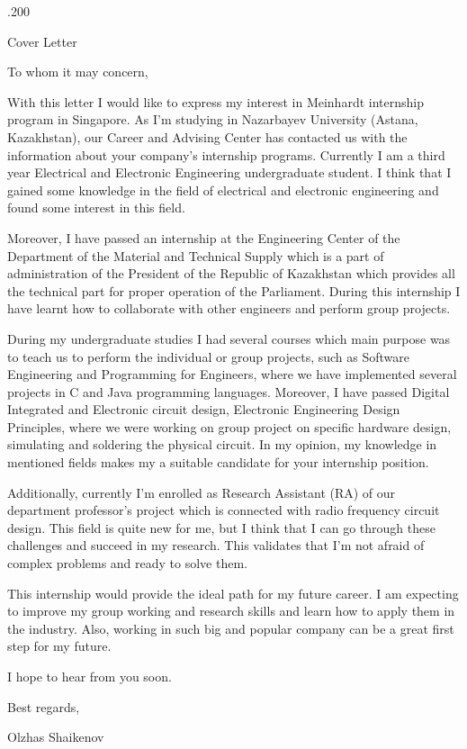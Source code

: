 \documentclass[]{res} %
\begin{document}


\moveleft.200\hoffset\centerline{Cover Letter}
To whom it may concern,

With this letter I would like to express my interest in Meinhardt internship program in Singapore. As I'm studying in Nazarbayev University (Astana, Kazakhstan), our Career and Advising Center has contacted us with the information about your company's internship programs. Currently I am a third year Electrical and Electronic Engineering undergraduate student. I think that I gained some knowledge in the field of electrical and electronic engineering and found some interest in this field. 

Moreover, I have passed an internship at the Engineering Center of the Department of the Material and Technical Supply which is a part of administration of the President of the Republic of Kazakhstan which provides all the technical part for proper operation of the Parliament. During this internship I have learnt how to collaborate with other engineers and perform group projects. 

During my undergraduate studies I had several courses which main purpose was to teach us to perform the individual or group projects, such as Software Engineering and Programming for Engineers, where we have implemented several projects in C and Java programming languages. Moreover, I have passed Digital Integrated and Electronic circuit design, Electronic Engineering Design Principles, where we were working on group project on specific hardware design, simulating and soldering the physical circuit. In my opinion, my knowledge in mentioned fields makes my a suitable candidate for your internship position.

Additionally, currently I'm enrolled as Research Assistant (RA) of our department professor's project which is connected with radio frequency circuit design. This field is quite new for me, but I think that I can go through these challenges and succeed in my research. This validates that I'm not afraid of complex problems and ready to solve them.

This internship would provide the ideal path for my future career. I am expecting to improve my group working and research skills and learn how to apply them in the industry. Also, working in such big and popular company can be a great first step for my future.

I hope to hear from you soon.

Best regards, 

Olzhas Shaikenov

 
\end{document}
